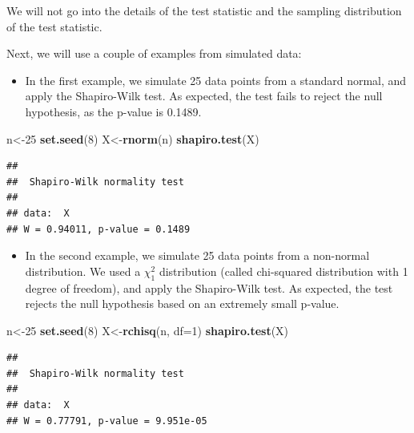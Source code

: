 \documentclass[
]{book}
\newenvironment{Shaded}{\begin{snugshade}}{\end{snugshade}}
\newcommand{\AttributeTok}[1]{\textcolor[rgb]{0.13,0.29,0.53}{#1}}
\newcommand{\DecValTok}[1]{\textcolor[rgb]{0.00,0.00,0.81}{#1}}
\newcommand{\FunctionTok}[1]{\textcolor[rgb]{0.13,0.29,0.53}{\textbf{#1}}}
\newcommand{\NormalTok}[1]{#1}
\newcommand{\OtherTok}[1]{\textcolor[rgb]{0.56,0.35,0.01}{#1}}
\providecommand{\tightlist}{%
  \setlength{\itemsep}{0pt}\setlength{\parskip}{0pt}}
\begin{document}
We will not go into the details of the test statistic and the sampling distribution of the test statistic.

Next, we will use a couple of examples from simulated data:

\begin{itemize}
\tightlist
\item
  In the first example, we simulate 25 data points from a standard normal, and apply the Shapiro-Wilk test. As expected, the test fails to reject the null hypothesis, as the p-value is 0.1489.
\end{itemize}

\begin{Shaded}
\begin{Highlighting}[]
\NormalTok{n}\OtherTok{\textless{}{-}}\DecValTok{25}
\FunctionTok{set.seed}\NormalTok{(}\DecValTok{8}\NormalTok{)}
\NormalTok{X}\OtherTok{\textless{}{-}}\FunctionTok{rnorm}\NormalTok{(n)}
\FunctionTok{shapiro.test}\NormalTok{(X)}
\end{Highlighting}
\end{Shaded}

\begin{verbatim}
## 
##  Shapiro-Wilk normality test
## 
## data:  X
## W = 0.94011, p-value = 0.1489
\end{verbatim}

\begin{itemize}
\tightlist
\item
  In the second example, we simulate 25 data points from a non-normal distribution. We used a \(\chi_1^2\) distribution (called chi-squared distribution with 1 degree of freedom), and apply the Shapiro-Wilk test. As expected, the test rejects the null hypothesis based on an extremely small p-value.
\end{itemize}

\begin{Shaded}
\begin{Highlighting}[]
\NormalTok{n}\OtherTok{\textless{}{-}}\DecValTok{25}
\FunctionTok{set.seed}\NormalTok{(}\DecValTok{8}\NormalTok{)}
\NormalTok{X}\OtherTok{\textless{}{-}}\FunctionTok{rchisq}\NormalTok{(n, }\AttributeTok{df=}\DecValTok{1}\NormalTok{)}
\FunctionTok{shapiro.test}\NormalTok{(X)}
\end{Highlighting}
\end{Shaded}

\begin{verbatim}
## 
##  Shapiro-Wilk normality test
## 
## data:  X
## W = 0.77791, p-value = 9.951e-05
\end{verbatim}

  
\end{document}
